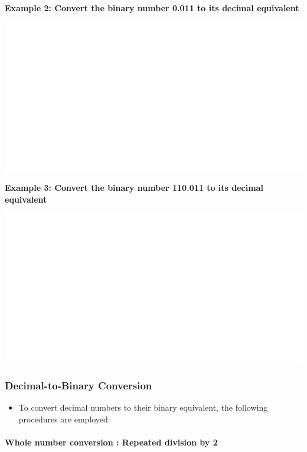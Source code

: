 \documentclass[]{book}
\providecommand{\tightlist}{%
  \setlength{\itemsep}{0pt}\setlength{\parskip}{0pt}}
\let\oldparagraph\paragraph
\renewcommand{\paragraph}[1]{\oldparagraph{#1}\mbox{}}
\begin{document}
\textbf{Example 2: Convert the binary number 0.011 to its decimal equivalent}

\begin{center}\includegraphics[width=1\linewidth]{figure/NSbox3-1} \end{center}

\textbf{Example 3: Convert the binary number 110.011 to its decimal equivalent}

\begin{center}\includegraphics[width=1\linewidth]{figure/NSbox4-1} \end{center}

\hypertarget{decimal-to-binary-conversion}{%
\subsubsection{Decimal-to-Binary Conversion}\label{decimal-to-binary-conversion}}

\begin{itemize}
\tightlist
\item
  To convert decimal numbers to their binary equivalent, the following procedures are employed:
\end{itemize}

\hypertarget{whole-number-conversion-repeated-division-by-2}{%
\paragraph{Whole number conversion : Repeated division by 2}\label{whole-number-conversion-repeated-division-by-2}}
\end{document}
